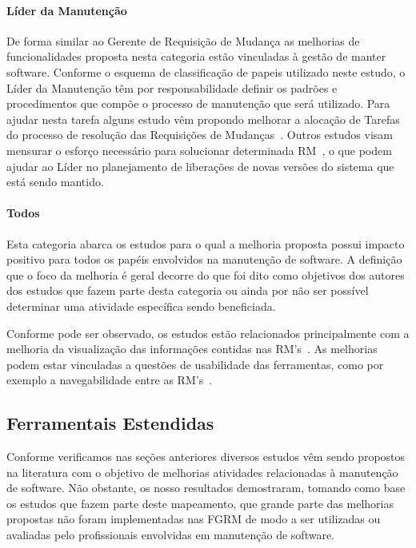 \paragraph{Líder da Manutenção}
De forma similar ao Gerente de Requisição de Mudança as melhorias de
funcionalidades proposta nesta categoria estão vinculadas à gestão de manter
software. Conforme o esquema de  classificação de papeis utilizado neste estudo,
o Líder da Manutenção têm por responsabilidade definir os padrões e
procedimentos que compõe o processo de manutenção que será utilizado. Para
ajudar nesta tarefa alguns estudo  vêm propondo melhorar a alocação de Tarefas
do processo de resolução das Requisições de Mudanças~\cite{netto2010automated}.
Outros estudos visam mensurar o esforço necessário para solucionar determinada
RM~\cite{Vijayakumar2014, Nagwani2010}, o que podem ajudar ao Líder no
planejamento de liberações de novas versões do sistema que está sendo mantido. 

\paragraph{Todos}
Esta categoria abarca os estudos para o qual a melhoria proposta possui impacto
positivo para todos os papéis envolvidos na manutenção de software. A definição
que o foco da melhoria é geral decorre do que foi dito como objetivos dos
autores dos estudos que fazem parte desta categoria ou ainda por não ser
possível determinar uma atividade específica sendo beneficiada.

Conforme pode ser observado, os estudos estão relacionados principalmente com a
melhoria da  visualização das informações contidas nas RM's~\cite{hora2012bug,
	takama2013application, dal2014bug}. As melhorias podem estar vinculadas a
questões de usabilidade das ferramentas, como por exemplo a navegabilidade entre
as RM's~\cite{dal2014bug}. 

\subsection{Ferramentais Estendidas}
\label{sub:ferrramentas_extendidas}

Conforme verificamos nas seções anteriores diversos estudos vêm sendo propostos
na literatura com o objetivo de melhorias atividades relacionadas à manutenção
de software. Não obstante, os nosso resultados demostraram, tomando como base os
estudos que fazem parte deste mapeamento, que grande parte das melhorias
propostas não foram implementadas nas FGRM de modo a ser utilizadas ou avaliadas
pelo profissionais envolvidas em manutenção de software. 

